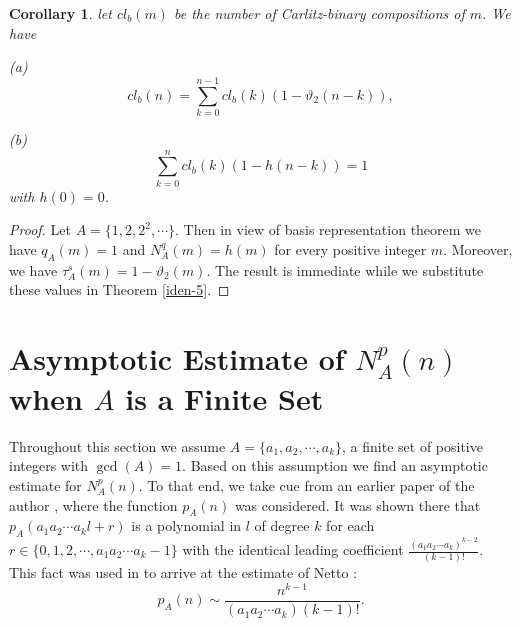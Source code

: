 \documentclass[11pt]{article}
\newtheorem{corollary}{Corollary}
\begin{document}
\begin{corollary}
let $cl_b(m)$ be the number of Carlitz-binary compositions of $m$. We have
\begin{description}
\item{(a)}
\begin{equation}
cl_b(n)=\sum_{k=0}^{n-1}cl_b(k)(1-\vartheta_2(n-k)),
\end{equation}
\item{(b)}
\begin{equation}
\sum_{k=0}^{n}cl_b(k)\left(1-h(n-k)\right)=1
\end{equation}
with $h(0)=0$.
\end{description}
\end{corollary}
\begin{proof}
Let $A=\{1,2,2^2,\cdots\}$. Then in view of basis representation theorem we have $q_A(m)=1$ and $N_A^q(m)=h(m)$ for every positive integer $m$. Moreover, we have $\tau^s_A(m)=1-\vartheta_2(m)$.  The result is immediate while we substitute these values in Theorem \ref{iden-5}.
\end{proof}
\section{ Asymptotic Estimate of $N_A^p(n)$ when $A$ is a Finite Set}
Throughout this section we assume $A=\{a_1,a_2,\cdots ,a_k\}$, a finite set of positive integers with $\gcd(A)=1$. 
Based on this assumption we find an asymptotic estimate for $N_A^p(n)$.
To that end, we take cue from an earlier paper of the author \cite{david1}, where the function $p_A(n)$ was considered. It was shown there that $p_A(a_1a_2\cdots a_kl+r)$ is a polynomial in $l$ of degree $k$ for each $r\in\{0,1,2,\cdots ,a_1a_2\cdots a_k-1\}$ with the identical leading coefficient $\frac{(a_1a_2\cdots a_k)^{k-2}}{(k-1)!}$. This fact was used in \cite{david1} to arrive at the estimate of Netto \cite{Netto}:
\[p_A(n)\sim\frac{n^{k-1}}{(a_1a_2\cdots a_k)(k-1)!}.
\]
\end{document}
